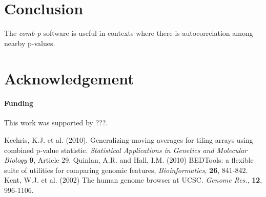 \documentclass{bioinfo}
\begin{document}
\section{Conclusion}
The \textit{comb-p} software is useful in contexts where there is autocorrelation among nearby p-values.

\section*{Acknowledgement}

\paragraph{Funding\textcolon} This work was supported by ???.

%
%
%
%
%

%

%
\begin{thebibliography}{}
 Kechris, K.J. et al. (2010).
Generalizing moving averages for tiling arrays using combined p-value
statistic. {\it Statistical Applications in Genetics and Molecular Biology}
{\bf 9}, Article 29.
 Quinlan, A.R. and Hall, I.M. (2010) BEDTools: a flexible suite of utilities for comparing genomic features, {\it Bioinformatics}, {\bf 26}, 841-842.
 Kent, W.J. et al. (2002) The human genome browser at UCSC. {\it Genome Res.}, {\bf 12}, 996-1106.

\end{thebibliography}
\end{document}
